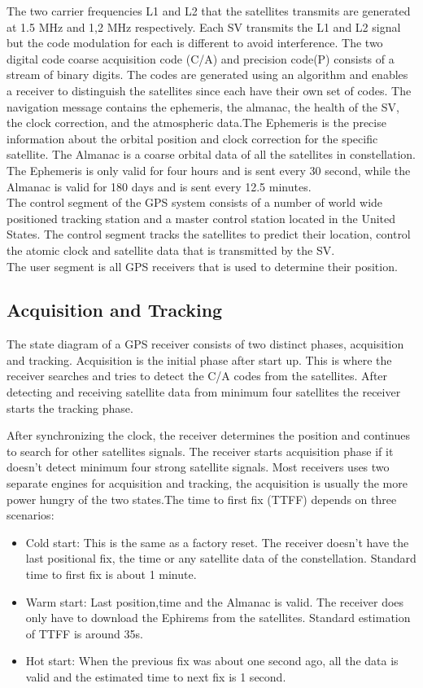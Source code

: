  
 The two carrier frequencies L1 and L2 that the satellites transmits are generated at 1.5 MHz and 1,2 MHz respectively.  Each SV transmits the L1 and L2 signal but the code modulation for each is different to avoid interference. The two digital code coarse acquisition code (C/A) and precision code(P) consists of a stream of binary digits. The codes are generated using an algorithm and enables a receiver to distinguish the satellites since each have their own set of codes. The navigation message contains the ephemeris, the almanac, the health of the SV, the clock correction, and the atmospheric data.The Ephemeris is the precise information about the orbital position and clock correction for the specific satellite. The Almanac is a coarse orbital data of all the satellites in constellation. The Ephemeris is only valid for four hours and is sent every 30  second, while the Almanac is valid for 180 days and is sent every 12.5 minutes. \\
 The control segment of the GPS system consists of a number of world wide positioned tracking station and a master control station located in the United States. The control segment tracks the satellites to predict their location, control the atomic clock and satellite data that is transmitted by the SV. \\ The user segment is all GPS receivers that is used to determine their position.
  
  
 \subsection{Acquisition and Tracking}
  
The state diagram of a GPS receiver consists of two distinct phases, acquisition and tracking. Acquisition is the initial phase after start up. This is where the receiver searches and tries to detect the C/A codes from the satellites. After detecting and receiving satellite data from minimum four satellites the receiver starts the tracking phase.

After synchronizing the clock, the receiver determines the position and continues to search for other satellites signals. The receiver starts acquisition phase if it doesn't detect minimum four strong satellite signals.
Most receivers uses two separate engines for acquisition and tracking, the acquisition is usually the more power hungry of the two states.The time to first fix (TTFF) depends on three scenarios:
\begin{itemize}
\item Cold start: This is the same as a factory reset. The receiver doesn't have the last positional fix, the time or any satellite data of the constellation. Standard time to first fix  is about 1 minute.
\item Warm start: Last position,time and the Almanac is valid. The receiver does only have to download the Ephirems from the satellites. Standard estimation of TTFF is around 35s.
\item Hot start: When the previous fix was about one second ago, all the data is valid and the estimated time to next fix is 1 second. 

\end{itemize}




\newpage